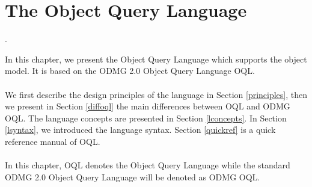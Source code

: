 

\newcommand{\mantitle}{\textsc{Object Query Language}}


\tableofcontents

\chapter{The Object Query Language}
\newcommand{\ex}{\emph{expr} }
\newcommand{\oqlsect}[1]{Section \ref{#1}}
\newcommand{\bin}[1]{\ex\texttt{#1} \ex}
\newcommand{\ass}[1]{\emph{lvalue} \texttt{#1} \ex}
\newcommand{\una}[1]{\texttt{#1} \ex}
\newcommand{\unar}[1]{\ex \texttt{#1}}
\newcommand{\ide}{\emph{identifier} }
\newcommand{\unide}[1]{\texttt{#1} \emph{identifier}}

\newcommand{\xtab}{longtable}
\newcommand{\btab}{\\\begin{longtable}}
\newcommand{\etab}{\end{longtable}}
\newcommand{\dimtab}{|p{3cm}|p{4cm}|}
\newcommand{\dimtabx}{|p{3cm}|p{5cm}|}

\newcommand{\rerr}{\emph{raises an error}}
\newcommand{\Cidem}{expression syntax, semantics, associativity
and precedence are quite identical to the corresponding C and C++ expressions}.
\newcommand{\geninfo}{\hline \multicolumn{2}{|c|}{\emph{General Information}}}
\newcommand{\expex}[1]{\hline \multicolumn{#1}{|c|}{\emph{Expression Examples}}}
\newcommand{\poscomb}[1]{\hline \multicolumn{#1}{|c|}{\emph{Possible Operand Combinations}}}
\newcommand{\bettabx}{\mbox{ }\\\\\mbox{ }\\}
\newcommand{\bettab}{\mbox{}}

In this chapter, we present the \eyedb Object Query Language which supports
the \eyedb object model. It is based on the ODMG 2.0 Object Query Language
OQL.
\\
\\
We first describe the design principles of the language in
\oqlsect{principles}, then
we present in \oqlsect{diffoql} the main differences between \eyedb
OQL and ODMG OQL.
The language concepts are presented in \oqlsect{lconcepts}.
In \oqlsect{lsyntax}, we introduced the language syntax.
\oqlsect{quickref} is a quick reference manual of OQL.
\\
\\
In this chapter, OQL denotes the \eyedb Object Query Language while
the standard ODMG 2.0 Object Query Language will be denoted as ODMG OQL.

